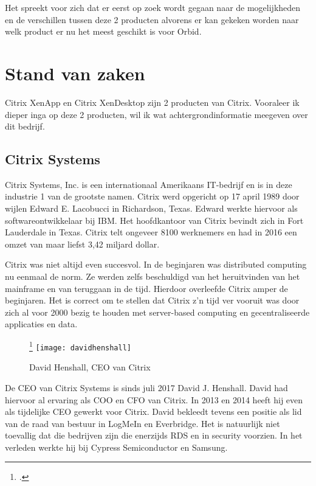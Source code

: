 Het spreekt voor zich dat er eerst op zoek wordt gegaan naar de mogelijkheden en de verschillen tussen deze 2 producten alvorens er kan gekeken worden naar welk product er nu het meest geschikt is voor Orbid.


\section{Stand van zaken}
\label{sec:stand-van-zaken}


Citrix XenApp en Citrix XenDesktop zijn 2 producten van Citrix. Vooraleer ik dieper inga op deze 2 producten, wil ik wat achtergrondinformatie meegeven over dit bedrijf.
\subsection{Citrix Systems}
Citrix Systems, Inc. is een internationaal Amerikaans IT-bedrijf en is in deze industrie 1 van de grootste namen. Citrix werd opgericht op 17 april 1989 door wijlen Edward E. Lacobucci in Richardson, Texas. Edward werkte hiervoor als softwareontwikkelaar bij IBM. Het hoofdkantoor van Citrix bevindt zich in Fort Lauderdale in Texas. Citrix telt ongeveer 8100 werknemers en had in 2016 een omzet van maar liefst 3,42 miljard dollar.

Citrix was niet altijd even succesvol. In de beginjaren was distributed computing nu eenmaal de norm. Ze werden zelfs beschuldigd van het heruitvinden van het mainframe en van teruggaan in de tijd. Hierdoor overleefde Citrix amper de beginjaren. Het is correct om te stellen dat Citrix z’n tijd ver vooruit was door zich al voor 2000 bezig te houden met server-based computing en gecentraliseerde applicaties en data.
\begin{figure}
	\caption{David Henshall, CEO van Citrix}
	\footcite{Citrix2017e}
	\texttt{[image: davidhenshall]}
\end{figure}
De CEO van Citrix Systems is sinds juli 2017 David J. Henshall. David had hiervoor al ervaring als COO en CFO van Citrix. In 2013 en 2014 heeft hij even als tijdelijke CEO gewerkt voor Citrix. David bekleedt tevens een positie als lid van de raad van bestuur in LogMeIn en Everbridge. Het is natuurlijk niet toevallig dat die bedrijven zijn die enerzijds RDS en in security voorzien. In het verleden werkte hij bij Cypress Semiconductor en Samsung.


